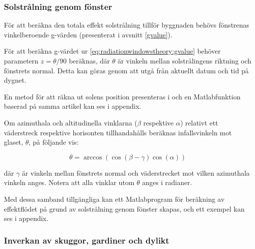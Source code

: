 \subsubsection{Solstrålning genom fönster}

För att beräkna den totala effekt solstrålning tillför byggnaden behövs fönstrenas vinkelberoende g-värden (presenterat i avsnitt \ref{gvalue}). 

För att beräkna g-värdet ur \eqref{eq:radiationwindowstheory:gvalue} behöver parametern $z = \theta/90$ beräknas, där $\theta$ är vinkeln mellan solstrålingens riktning och fönstrets normal. Detta kan göras genom att utgå från aktuellt datum och tid på dygnet.

En metod för att räkna ut solens position presenteras i \cite{walraven78} och en Matlabfunktion baserad på samma artikel kan ses i appendix. %

Om azimuthala och altitudinella vinklarna ($\beta$ respektive $\alpha$) relativt ett väderstreck respektive horisonten tillhandahålls beräknas infallsvinkeln mot glaset, $\theta$, på följande vis:

\begin{equation} 
\theta = \arccos{\left( \cos{\left(\beta - \gamma\right)}\cos{\left(\alpha\right)}\right)}
\end{equation}

där $\gamma$ är vinkeln mellan fönstrets normal och väderstrecket mot vilken azimuthala vinkeln anges. Notera att alla vinklar utom $\theta$ anges i radianer.

Med dessa samband tillgängliga kan ett Matlabprogram för beräkning av effektflödet på grund av solstrålning genom fönster skapas, och ett exempel kan ses i appendix. %


\subsubsection{Inverkan av skuggor, gardiner och dylikt}


\begin{comment}
Simmler & Binder
Experimental and numerical determination of the total solar energy transmittance of glazing with venetian blind shading
\end{comment}


\begin{comment}
I diskussion:
- Hur kan man koppla detta till värmesystemet?
	- Registrera intensitet, tid på dygnet och datum
	- Beräkna ungefärlig tillförd effekt
	- Kompensera genom att säga till värmesystemet att minska/stänga inflödet
- Blir det lättare att helt enkelt mäta temperaturen i rummet och gå utifrån det? Vad är mer kostnadseffektivt?
\end{comment}
